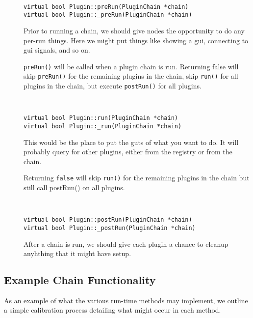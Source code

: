 \begin{description}
\item[] \
\begin{lstlisting}[frame=single]
virtual bool Plugin::preRun(PluginChain *chain)
virtual bool Plugin::_preRun(PluginChain *chain)
\end{lstlisting}

Prior to running a chain, we should give nodes the opportunity
to do any per-run things. Here we might put things like 
showing a gui, connecting to gui signals, and so on. 

{\tt preRun()} will be called when a plugin chain is run. Returning
false will skip {\tt preRun()} for the remaining plugins in the chain,
skip {\tt run()} for all plugins in the chain, but execute {\tt postRun()}
for all plugins.


\item[] \
\begin{lstlisting}[frame=single]
virtual bool Plugin::run(PluginChain *chain)
virtual bool Plugin::_run(PluginChain *chain)
\end{lstlisting}

This would be the place to put the guts of what you want to do.
It will probably query for other plugins, either from the registry
or from the chain.

Returning {\tt false} will skip {\tt run()} for the remaining plugins in the chain
but still call postRun() on all plugins.

\item[] \
\begin{lstlisting}[frame=single]
virtual bool Plugin::postRun(PluginChain *chain)
virtual bool Plugin::_postRun(PluginChain *chain)
\end{lstlisting}

After a chain is run, we should give each plugin a chance to cleanup
anyhthing that it might have setup. 

\end{description}

\subsection{Example Chain Functionality}

As an example of what the various run-time methods may implement, 
we outline a simple calibration process detailing what might 
occur in each method.

